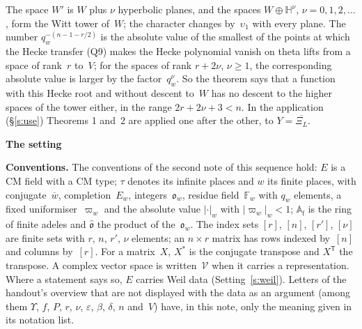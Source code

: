 \documentclass[11pt,a4paper]{article}
\newcommand{\m}[1]{\mbox{$#1$}}        %
\newcommand{\sect}[2]{\refstepcounter{section}\label{#2}\par\addvspace{19pt plus 4pt minus 2pt}\Needspace{7\baselineskip}%
  \noindent\llap{{\fontsize{13.2}{16}\selectfont\bfseries\color{inkfaint}\thesection}\hspace{9pt}}%
  {\fontsize{13.2}{16}\selectfont\bfseries\color{ink}#1}\par\nopagebreak\vspace{-1pt}}
\theoremstyle{plainx}
\theoremstyle{uprightx}
\newenvironment{conventions}{\par\addvspace{5pt}\noindent\textbf{Conventions.}\enspace\ignorespaces}{\par\addvspace{3pt}}
\newcommand{\AAf}{\mathbb{A}_{\mathrm{f}}}
\newcommand{\FF}{\mathbb{F}}
\newcommand{\oo}{\mathfrak{o}}
\newcommand{\ohat}{\hat{\mathfrak{o}}}
\newcommand{\coef}[2]{#2_{#1}}
\newcommand{\hyp}[2]{#1\oplus\mathbb{H}^{#2}}
\newcommand{\conj}[1]{\overline{#1}}
\begin{document}
The space $W'$ is $W$ plus $\nu$ hyperbolic planes, and the spaces \m{\hyp{W}{\nu}}, \m{\nu=0,1,2,\dots}, form
the Witt tower of~$W$; the character changes by~$\upsilon_{1}$ with every plane. The number
\m{q_{w}^{-(n-1-r/2)}} is the absolute value of the smallest of the points at which the Hecke transfer (Q9) makes
the Hecke polynomial vanish on theta lifts from a space of rank~$r$ to~$V$; for the spaces of rank \m{r+2\nu},
\m{\nu\ge1}, the corresponding absolute value is larger by the factor~\m{q_{w}^{\nu}}. So the theorem says that a
function with this Hecke root and without descent to~$W$ has no descent to the higher spaces of the tower
either, in the range \m{2r+2\nu+3<n}. In the application (§\ref{s:use}) Theorems 1 and~2 are applied one after
the other, to \m{Y=\conj{\coef{L}{\Xi}}}.

\sect{The setting}{s:setting}
\begin{conventions}\label{c:conventions}
The conventions of the second note of this sequence hold: $E$ is a CM field with a CM type; $\tau$ denotes its
infinite places and $w$ its finite places, with conjugate~\m{\conj{w}}, completion~$E_{w}$, integers~$\oo_{w}$,
residue field~$\FF_{w}$ with $q_{w}$ elements, a fixed uniformiser~$\varpi_{w}$ and the absolute value
\m{|\cdot|_{w}} with \m{|\varpi_{w}|_{w}<1}; \m{\AAf} is the ring of finite adeles and \m{\ohat} the product of
the~$\oo_{w}$. The index sets $[r]$, $[n]$, $[r']$, $[\nu]$ are finite sets with $r$, $n$, $r'$, $\nu$ elements;
an \m{n\times r} matrix has rows indexed by~$[n]$ and columns by~$[r]$. For a matrix~$X$, \m{X^{*}} is the
conjugate transpose and \m{X^{\mathsf{T}}} the transpose. A complex vector space is written~$\mathcal{V}$ when it
carries a representation. Where a statement says so, $E$ carries Weil data (Setting~\ref{s:weil}). Letters of
the handout's overview that are not displayed with the data as an argument (among them $\Upsilon$, $f$, $P$, $r$, $\nu$,
$\varepsilon$, $\beta$, $\delta$, $n$ and~$V$) have, in this note, only the meaning given in its notation list.
\end{conventions}
\end{document}
